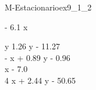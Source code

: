 
\begin{bilevelmodel}{M-Estacionario}{ex9_1_2}
    \begin{upperlevel}{- 6.1 x}{
        
    }
    \end{upperlevel}
    \begin{lowerlevel}{y}{
         1.26 y - 11.27  \\ 
 - x + 0.89 y - 0.96  \\ 
 x - 7.0  \\ 
 4 x + 2.44 y - 50.65 
    }
    \end{lowerlevel}
\end{bilevelmodel}
    
        